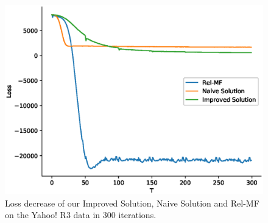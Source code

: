 \documentclass[sigconf]{acmart}
\begin{document}
\begin{figure}[!htb]
	\begin{center}
		
		\includegraphics[width=\columnwidth]{fig/loss.eps}
		
	\end{center}
	\caption{Loss decrease of our Improved Solution, Naive Solution and Rel-MF on the Yahoo! R3 data in 300 iterations.}
	\label{fig:loss}
\end{figure}
\end{document}
